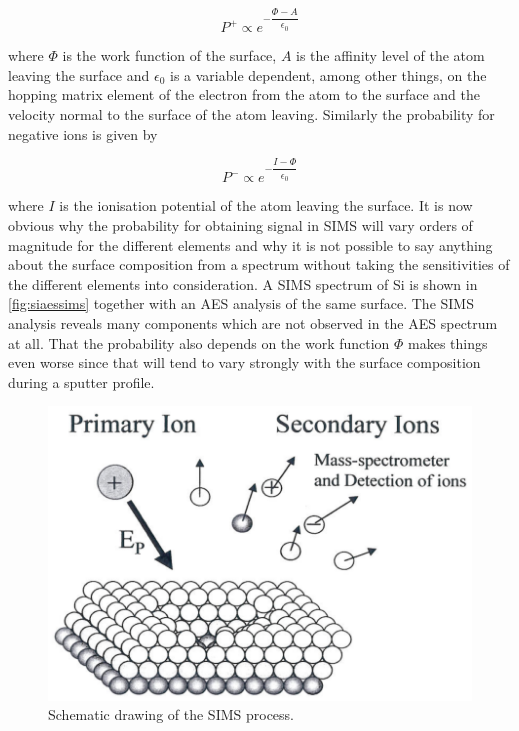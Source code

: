 \begin{equation}
P^+\propto e^{-\dfrac{\Phi-A}{\epsilon_0}} 
\end{equation}

\noindent where $\Phi$ is the work function of the surface, $A$ is the affinity level of the atom leaving the surface and $\epsilon_0$ is a variable dependent, among other things, on the hopping matrix element of the electron from the atom to the surface and the velocity normal to the surface of the atom leaving. Similarly the probability for negative ions is given by

\begin{equation}
P^-\propto e^{-\dfrac{I-\Phi}{\epsilon_0}} 
\end{equation}

\noindent where $I$ is the ionisation potential of the atom leaving the surface. It is now obvious why the probability for obtaining signal in SIMS will vary orders of magnitude for the different elements and why it is not possible to say anything about the surface composition from a spectrum without taking the sensitivities of the different elements into consideration. A SIMS spectrum of Si is shown in \autoref{fig:siaessims} together with an AES analysis of the same surface. The SIMS analysis reveals many components which are not observed in the AES spectrum at all. That the probability also depends on the work function $\Phi$ makes things even worse since that will tend to vary strongly with the surface composition during a sputter profile.

\begin{figure}[h!]
	\begin{center}
	\includegraphics[scale=3]{figures/11_06.png}
	\caption{Schematic drawing of the SIMS process.}
	\label{fig:simsscheme}
	\end{center}
\end{figure}

